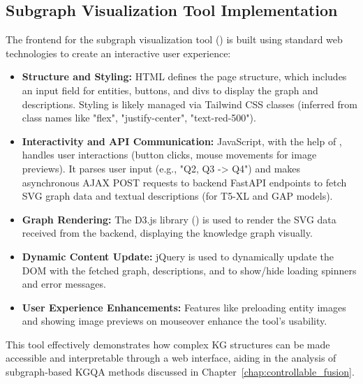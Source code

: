 \subsection{Subgraph Visualization Tool Implementation}
The frontend for the subgraph visualization tool () is built using standard web technologies to create an interactive user experience:
\begin{itemize}
    \item \textbf{Structure and Styling:} HTML defines the page structure, which includes an input field for entities, buttons, and divs to display the graph and descriptions. Styling is likely managed via Tailwind CSS classes (inferred from class names like "flex", "justify-center", "text-red-500").
    \item \textbf{Interactivity and API Communication:} JavaScript, with the help of , handles user interactions (button clicks, mouse movements for image previews). It parses user input (e.g., "Q2, Q3 -> Q4") and makes asynchronous AJAX POST requests to backend FastAPI endpoints to fetch SVG graph data and textual descriptions (for T5-XL and GAP models).
    \item \textbf{Graph Rendering:} The D3.js library () is used to render the SVG data received from the backend, displaying the knowledge graph visually.
    \item \textbf{Dynamic Content Update:} jQuery is used to dynamically update the DOM with the fetched graph, descriptions, and to show/hide loading spinners and error messages.
    \item \textbf{User Experience Enhancements:} Features like preloading entity images and showing image previews on mouseover enhance the tool's usability.
\end{itemize}
This tool effectively demonstrates how complex KG structures can be made accessible and interpretable through a web interface, aiding in the analysis of subgraph-based KGQA methods discussed in Chapter~\ref{chap:controllable_fusion}.


